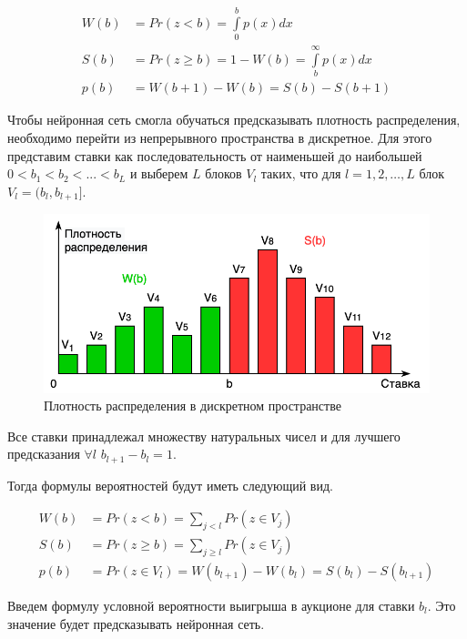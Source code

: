 \documentclass[times,specification,annotation]{itmo-student-thesis}
\begin{document}
\begin{equation}
    \begin{split}
        W(b) & = Pr(z < b) = \int\limits_{0}^b p(x) dx \\
        S(b) & = Pr(z \geq b) = 1 - W(b) = \int\limits_{b}^{\infty} p(x) dx \\
        p(b) & = W(b + 1) - W(b) = S(b) - S(b + 1)            
    \end{split}
\end{equation}

Чтобы нейронная сеть смогла обучаться предсказывать плотность распределения, 
необходимо перейти из непрерывного пространства в дискретное.
Для этого представим ставки как последовательность 
от наименьшей до наибольшей $0<b_1<b_2< ...< b_L$ и выберем $L$ блоков $V_l$ таких, 
что для $l=1, 2, …, L$ блок $V_l=(b_l,b_{l+1}]$.

\begin{figure}[h]
    \caption{Плотность распределения в дискретном пространстве}
    \centering
    \includegraphics{w_s_discret.png}
\end{figure}

Все ставки принадлежал множеству натуральных чисел и для лучшего предсказания $\forall l$  $b_{l+1}-b_l=1$.

Тогда формулы вероятностей будут иметь следующий вид.

\begin{equation}
    \begin{split}
        W(b) & = Pr(z < b) = \sum_{j<l} Pr(z \in V_j) \\
        S(b) & = Pr(z \geq b) = \sum_{j \geq l} Pr(z \in V_j) \\
        p(b) & = Pr(z \in V_l) =  W(b_{l + 1}) - W(b_l) = S(b_l) - S(b_{l + 1})
    \end{split}
\end{equation}

Введем формулу условной вероятности выигрыша в аукционе для ставки $b_l$. 
Это значение будет предсказывать нейронная сеть.
\end{document}

